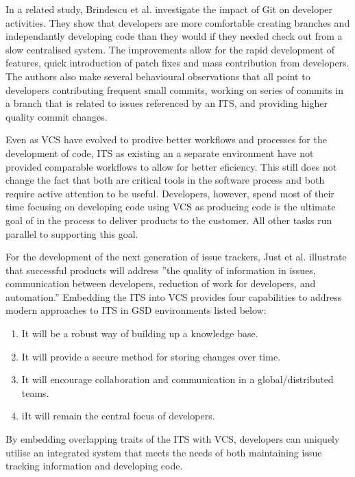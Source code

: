 \documentclass{mproj}
\begin{document}
In a related study, Brindescu et al. \cite{Brindescu:2014} investigate the impact of Git on developer activities. They show that developers are more comfortable creating branches and independantly developing code than they would if they needed check out from a slow centralised system. The improvements allow for the rapid development of features, quick introduction of patch fixes and mass contribution from developers. The authors also make several behavioural observations that all point to developers contributing frequent small commits, working on series of commits in a branch that is related to issues referenced by an ITS, and providing higher quality commit changes.

Even as VCS have evolved to prodive better workflows and processes for the development of code, ITS as existing an a separate environment have not provided comparable workflows to allow for better eficiency. This still does not change the fact that both are critical tools in the software process and both require active attention to be useful. Developers, however, spend most of their time focusing on developing code using VCS as producing code is the ultimate goal of in the process to deliver products to the customer. All other tasks run parallel to supporting this goal.

For the development of the next generation of issue trackers, Just et al. \cite{Just:2008} illustrate that successful products will address ”the quality of information in issues, communication between developers, reduction of work for developers, and automation.” Embedding the ITS into VCS provides four capabilities to address modern approaches to ITS in GSD environments listed below:

\begin{enumerate}
  \item It will be a robust way of building up a knowledge base. 
  \item It will provide a secure method for storing changes over time.
  \item It will encourage collaboration and communication in a global/distributed teams.
  \item iIt will remain the central focus of developers.
\end{enumerate}

By embedding overlapping traits of the ITS with VCS, developers can uniquely utilise an integrated system that meets the needs of both maintaining issue tracking information and developing code. 
\end{document}
